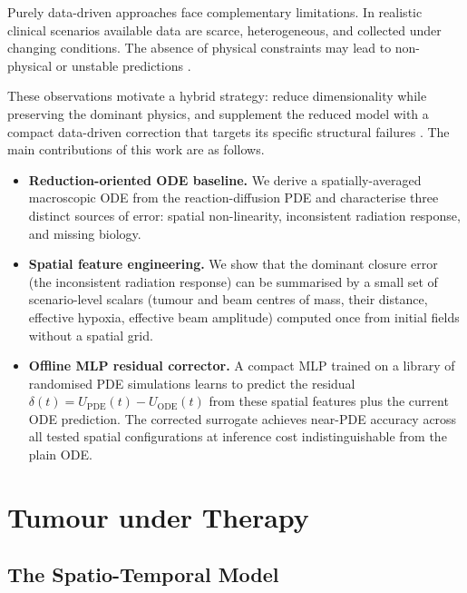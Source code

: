 \documentclass[runningheads]{llncs}
\begin{document}
Purely data-driven approaches face complementary limitations.  In realistic clinical
scenarios available data are scarce, heterogeneous, and collected under changing
conditions.  The absence of physical constraints may lead to non-physical or unstable
predictions \cite{karniadakis2021physics,brunton2022data}.

These observations motivate a hybrid strategy: reduce dimensionality while preserving
the dominant physics, and supplement the reduced model with a compact data-driven
correction that targets its specific structural failures
\cite{raissi2019physics,reichstein2019deep}.  The main contributions of
this work are as follows.

\begin{itemize}
    \item \textbf{Reduction-oriented ODE baseline.}  We derive a spatially-averaged
    macroscopic ODE from the reaction-diffusion PDE and characterise three distinct
    sources of error: spatial non-linearity, inconsistent radiation response, and
    missing biology.

    \item \textbf{Spatial feature engineering.}  We show that the dominant closure
    error (the inconsistent radiation response) can be summarised by a small set of
    scenario-level scalars (tumour and beam centres of mass, their distance, effective
    hypoxia, effective beam amplitude) computed once from initial fields without a
    spatial grid.

    \item \textbf{Offline MLP residual corrector.}  A compact MLP trained on a
    library of randomised PDE simulations learns to predict the residual
    $\delta(t) = U_{\mathrm{PDE}}(t) - U_{\mathrm{ODE}}(t)$ from these spatial
    features plus the current ODE prediction.  The corrected surrogate achieves
    near-PDE accuracy across all tested spatial configurations at inference cost
    indistinguishable from the plain ODE.
\end{itemize}

\section{Tumour under Therapy}

\subsection{The Spatio-Temporal Model}
\end{document}

